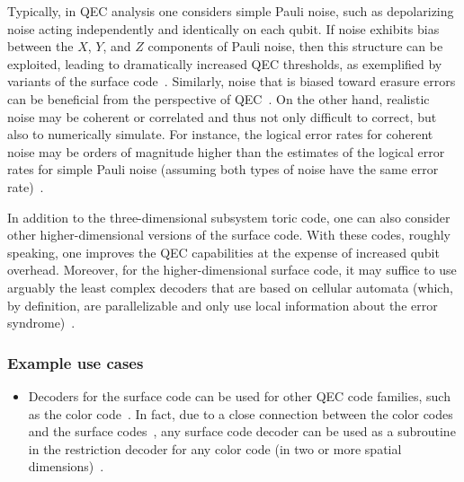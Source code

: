 \begin{refsection}
Typically, in QEC analysis one considers simple Pauli noise, such as depolarizing noise acting independently and identically on each qubit.
If noise exhibits bias between the $X$, $Y$, and $Z$ components of Pauli noise, then this structure can be exploited, leading to dramatically increased QEC thresholds, as exemplified by variants of the surface code~\cite{tuckett2018ultrahighErrorThreshold,bonillaAtaides2021XZZXsurfaceCode,dua2022cliffordDeformed}.
Similarly, noise that is biased toward erasure errors can be beneficial from the perspective of QEC~\cite{stace2009thresholdsTopologicalCodes,wu2022erasureConversion,kubica2022erasure}.
On the other hand, realistic noise may be coherent or correlated and thus not only difficult to correct, but also to numerically simulate.
For instance, the logical error rates for coherent noise may be orders of magnitude higher than the estimates of the logical error rates for simple Pauli noise (assuming both types of noise have the same error rate)~\cite{iyer2018smallQCneeded}.


In addition to the three-dimensional subsystem toric code, one can also consider other higher-dimensional versions of the surface code.
With these codes, roughly speaking, one improves the QEC capabilities at the expense of increased qubit overhead.
Moreover, for the higher-dimensional surface code, it may suffice to use arguably the least complex decoders that are based on cellular automata (which, by definition, are parallelizable and only use local information about the error syndrome)~\cite{dennis2002TopologicalQuantumMemory,breuckmann2017localDecoders,kubica2019cellularAutomatonDecoders,vasmer2021cellularAtomatonDecoders}.



\subsubsection*{Example use cases}


\begin{itemize}
    \item Decoders for the surface code can be used for other QEC code families, such as the color code~\cite{bombin2006topologicalQuantumDistillation,bombin2007exactTopologicalQuantumOrder,kubica2018phdThesis}.
    In fact, due to a close connection between the color codes and the surface codes~\cite{bombin2012universalTopologicalPhase,kubica2015unfoldingColorCode}, any surface code decoder can be used as a subroutine in the restriction decoder for any color code (in two or more spatial dimensions)~\cite{kubica2023efficientColorCodeDecoders,vasmer2022morphingQuantumCodes}. 
\end{itemize}


\end{refsection}
